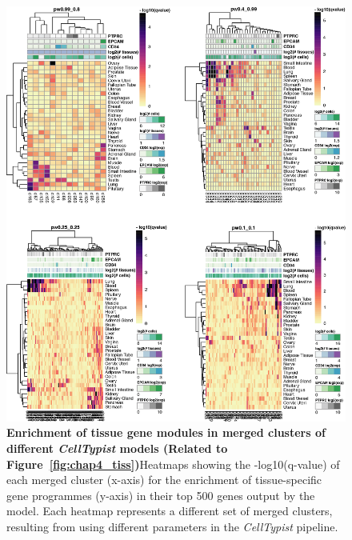 \begin{figure}[ht!] 
\centering
\includegraphics[scale=0.79]{Appendix2/Figs/appB_clmGSEA.png} %
\caption[Enrichment of tissue gene modules in merged clusters of different \textit{CellTypist} models]{\textbf{Enrichment of tissue gene modules in merged clusters of different \textit{CellTypist} models (Related to Figure~\ref{fig:chap4_tiss})}\newline Heatmaps showing the -log10(q-value) of each merged cluster (x-axis) for the enrichment of tissue-specific gene programmes (y-axis) in their top 500 genes output by the model. Each heatmap represents a different set of merged clusters, resulting from using different parameters in the \textit{CellTypist} pipeline.}
\label{fig:appB_clmGSEA}
\end{figure}


